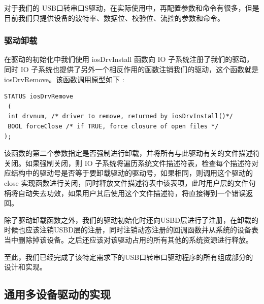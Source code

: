 对于我们的 USB口转串口S驱动，在实际使用中，再配置参数和命令有很多，但是目前我们只提供设备的波特率、数据位、校验位、流控的参数和命令。


\subsubsection{驱动卸载}
	在驱动的初始化中我们使用 iosDrvInstall 函数向 IO 子系统注册了我们的驱动，同时 IO 子系统也提供了另外一个相反作用的函数注销我们的驱动，这个函数就是 iosDrvRemove。该函数调用原型如下 :
\lstset{language=C}
\begin{lstlisting}
STATUS iosDrvRemove 
 ( 
 int drvnum, /* driver to remove, returned by iosDrvInstall()*/ 
 BOOL forceClose /* if TRUE, force closure of open files */ 
); 
\end{lstlisting}

该函数的第二个参数指定是否强制进行卸载，并将所有与此驱动有关的文件描述符关闭。如果强制关闭，则 IO 子系统将遍历系统文件描述符表，检查每个描述符对应结构中的驱动号是否等于要卸载驱动的驱动号，如果相同，则调用这个驱动的 close 实现函数进行关闭，同时释放文件描述符表中该表项，此时用户层的文件句柄将自动失去功效，如果用户其后使用这个文件描述符，将直接得到一个错误返回。

除了驱动卸载函数之外，我们的驱动初始化时还向USBD层进行了注册，在卸载的时候也应该注销USBD层的注册，同时注销动态注册的回调函数并从系统的设备表当中删除掉该设备。之后还应该对该驱动占用的所有其他的系统资源进行释放。



至此，我们已经完成了该特定需求下的USB口转串口驱动程序的所有组成部分的设计和实现。

\subsection{通用多设备驱动的实现}
